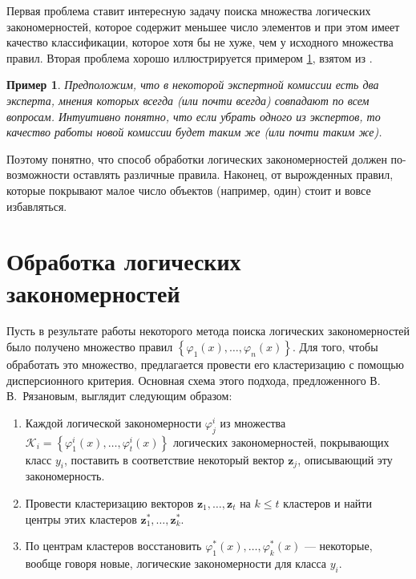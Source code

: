 \documentclass[12pt]{article}
\newtheorem{example}{Пример}
\begin{document}
Первая проблема ставит интересную задачу поиска множества логических
закономерностей, которое содержит меньшее число элементов и при этом
имеет качество классификации, которое хотя бы не хуже, чем у исходного
множества правил. Вторая проблема хорошо иллюстрируется примером
\ref{ex:same:experts}, взятом из \cite{voron10logicalgs}.

\begin{example}\label{ex:same:experts}
  Предположим, что в некоторой экспертной комиссии есть два эксперта,
  мнения которых всегда (или почти всегда) совпадают по всем
  вопросам. Интуитивно понятно, что если убрать одного из экспертов,
  то качество работы новой комиссии будет таким же (или почти таким
  же).
\end{example}

Поэтому понятно, что способ обработки логических закономерностей
должен по-возможности оставлять различные правила. Наконец, от
вырожденных правил, которые покрывают малое число объектов (например,
один) стоит и вовсе избавляться.

\section{Обработка логических закономерностей}
\label{sec:processing}


Пусть в результате работы некоторого метода поиска логических
закономерностей было получено множество правил \(\left\{\varphi_1(x),
\dots, \varphi_n(x)\right\}\). Для того, чтобы обработать это
множество, предлагается провести его кластеризацию с помощью
дисперсионного критерия. Основная схема этого подхода, предложенного
В.\,В.~Рязановым, выглядит следующим образом:

\begin{enumerate}
\item Каждой логической закономерности \(\varphi_j^i\) из множества
  \(
  \mathcal{K}_{i} = \left\{
  \varphi_1^i(x), \dots, \varphi_t^i(x)
  \right\}
  \)
  логических закономерностей, покрывающих класс \(y_i\), поставить в
  соответствие некоторый вектор \(\bm{z}_j\), описывающий эту
  закономерность.
\item Провести кластеризацию векторов \(\bm{z}_1, \dots, \bm{z}_t\) на
  \(k \leqslant t\) кластеров и найти центры этих кластеров
  \(\bm{z}_1^*, \dots, \bm{z}_k^*\).
\item По центрам кластеров восстановить \(\varphi_1^*(x), \dots,
  \varphi_k^*(x)\) --- некоторые, вообще говоря новые, логические
  закономерности для класса \(y_i\).
\end{enumerate}
\end{document}
